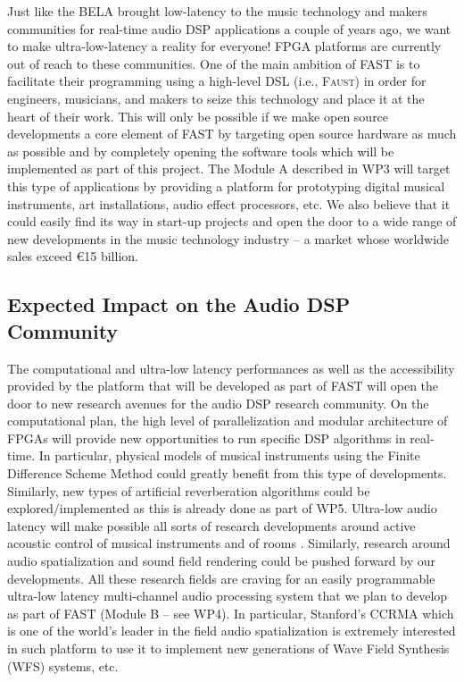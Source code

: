 \documentclass[a4paper,9pt]{extarticle}
\newcommand{\F}{\textsc{Faust}}
\newcommand{\PP}{FAST}
\begin{document}
Just like the BELA \cite{mcpherson2015} brought low-latency to the music technology and makers communities for real-time audio DSP applications a couple of years ago, we want to make ultra-low-latency a reality for everyone! FPGA platforms are currently out of reach to these communities. One of the main ambition of \PP{} is to facilitate their programming using a high-level DSL (i.e., \F{}) in order for engineers, musicians, and makers to seize this technology and place it at the heart of their work. This will only be possible if we make open source developments a core element of \PP{} by targeting open source hardware as much as possible and by completely opening the software tools which will be implemented as part of this project. The Module A described in WP3 will target this type of applications by providing a platform for prototyping digital musical instruments, art installations, audio effect processors, etc. We also believe that it could easily find its way in start-up projects and open the door to a wide range of new developments in the music technology industry -- a market whose worldwide sales exceed \euro{}15 billion.

\subsection{Expected Impact on the Audio DSP Community}

The computational and ultra-low latency performances as well as the accessibility provided by the platform that will be developed as part of \PP{} will open the door to new research avenues for the audio DSP research community. On the computational plan, the high level of parallelization and modular architecture of FPGAs will provide new opportunities to run specific DSP algorithms in real-time. In particular, physical models of musical instruments using the Finite Difference Scheme Method \cite{Bilbao2009} could greatly benefit from this type of developments. Similarly, new types of artificial reverberation algorithms could be explored/implemented as this is already done as part of WP5. Ultra-low audio latency will make possible all sorts of research developments around active acoustic control of musical instruments \cite{meurisse2015experimental} and of rooms \cite{Zhang2018}. Similarly, research around audio spatialization and sound field rendering could be pushed forward by our developments. All these research fields are craving for an easily programmable ultra-low latency multi-channel audio processing system that we plan to develop as part of \PP{} (Module B -- see WP4). In particular, Stanford's CCRMA which is one of the world's leader in the field audio spatialization is extremely interested in such platform to use it to implement new generations of Wave Field Synthesis (WFS) systems, etc. 
\end{document}
